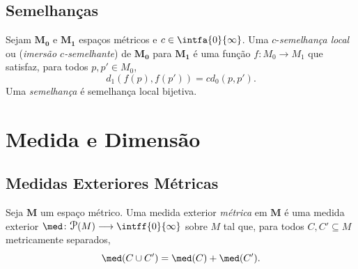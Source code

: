 \subsection{Semelhanças}

\begin{defi}
Sejam $\bm{M_0}$ e $\bm{M_1}$ espaços métricos e $c \in \intfa{0}{\infty}$. Uma $c$-\emph{semelhança local} ou (\emph{imersão $c$-semelhante}) de $\bm{M_0}$ para $\bm{M_1}$ é uma função $f\colon M_0 \to M_1$ que satisfaz, para todos $p,p' \in M_0$,
	\begin{equation*}
	d_1(f(p),f(p')) = c d_0(p,p').
	\end{equation*}
Uma \emph{semelhança} é semelhança local bijetiva.
\end{defi}

\section{Medida e Dimensão}

\subsection{Medidas Exteriores Métricas}

\begin{defi}
Seja $\bm M$ um espaço métrico. Uma medida exterior \emph{métrica} em $\bm M$ é uma medida exterior $\med\colon \p(M) \to \intff{0}{\infty}$ sobre $M$ tal que, para todos $C,C' \subseteq M$ metricamente separados,
	\begin{equation*}
	\med(C \cup C') = \med(C) + \med(C').
	\end{equation*}
\end{defi}

